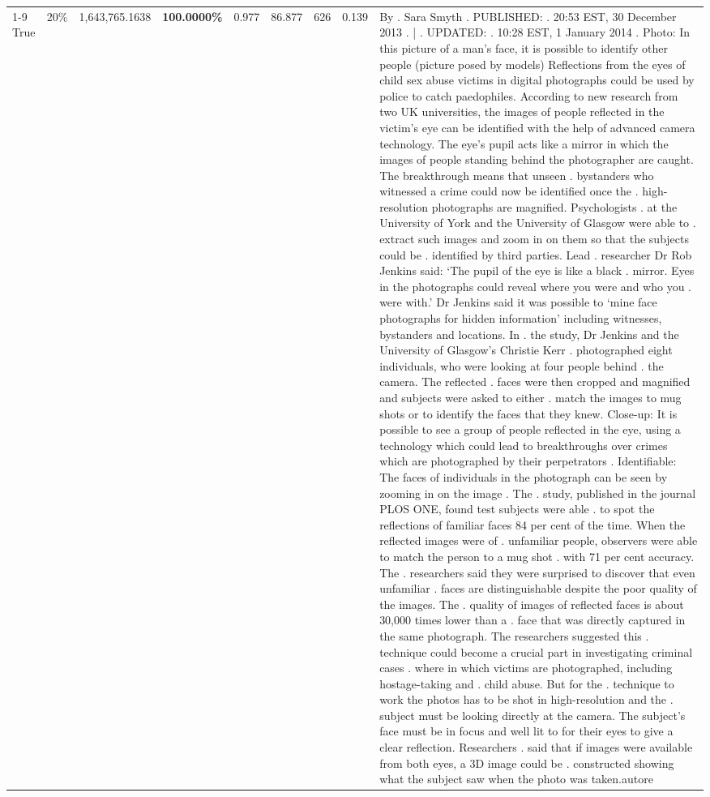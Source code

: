 \begin{table}[H]
\begin{tabular}{lllrlllll}
\cline{1-9} \cline{2-9}
True & 20\% & 1,643,765.1638 & \bfseries \color{red} 100.0000\% & 0.977 & 86.877 & 626 & 0.139 & By . Sara Smyth . PUBLISHED: . 20:53 EST, 30 December 2013 . | . UPDATED: . 10:28 EST, 1 January 2014 . Photo: In this picture of a man's face, it is possible to identify other people (picture posed by models) Reflections from the eyes of child sex abuse victims in digital photographs could be used by police to catch paedophiles. According to new research from two UK universities, the images of people reflected in the victim's eye can be identified with the help of advanced camera technology. The eye's pupil acts like a mirror in which the images of people standing behind the photographer are caught. The breakthrough means that unseen . bystanders who witnessed a crime could now be identified once the . high-resolution photographs are magnified. Psychologists . at the University of York and the University of Glasgow were able to . extract such images and zoom in on them so that the subjects could be . identified by third parties. Lead . researcher Dr Rob Jenkins said: ‘The pupil of the eye is like a black . mirror. Eyes in the photographs could reveal where you were and who you . were with.' Dr Jenkins said it was possible to ‘mine face photographs for hidden information' including witnesses, bystanders and locations. In . the study, Dr Jenkins and the University of Glasgow's Christie Kerr . photographed eight individuals, who were looking at four people behind . the camera. The reflected . faces were then cropped and magnified and subjects were asked to either . match the images to mug shots or to identify the faces that they knew. Close-up: It is possible to see a group of people reflected in the eye, using a technology which could lead to breakthroughs over crimes which are photographed by their perpetrators . Identifiable: The faces of individuals in the photograph can be seen by zooming in on the image . The . study, published in the journal PLOS ONE, found test subjects were able . to spot the reflections of familiar faces 84 per cent of the time. When the reflected images were of . unfamiliar people, observers were able to match the person to a mug shot . with 71 per cent accuracy. The . researchers said they were surprised to discover that even unfamiliar . faces are distinguishable despite the poor quality of the images. The . quality of images of reflected faces is about 30,000 times lower than a . face that was directly captured in the same photograph. The researchers suggested this . technique could become a crucial part in investigating criminal cases . where in which victims are photographed, including hostage-taking and . child abuse. But for the . technique to work the photos has to be shot in high-resolution and the . subject must be looking directly at the camera. The subject's face must be in focus and well lit to for their eyes to give a clear reflection. Researchers . said that if images were available from both eyes, a 3D image could be . constructed showing what the subject saw when the photo was taken.autore \\

\end{tabular}
\end{table}
